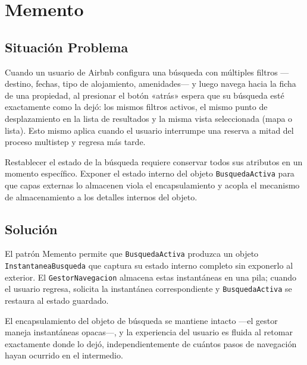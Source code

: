 
\chapter{Memento}

\section{Situación Problema}

Cuando un usuario de Airbnb configura una búsqueda con múltiples filtros
—destino, fechas, tipo de alojamiento, amenidades— y luego navega hacia
la ficha de una propiedad, al presionar el botón «atrás» espera que su
búsqueda esté exactamente como la dejó: los mismos filtros activos, el
mismo punto de desplazamiento en la lista de resultados y la misma vista
seleccionada (mapa o lista). Esto mismo aplica cuando el usuario
interrumpe una reserva a mitad del proceso multistep y regresa más tarde.

Restablecer el estado de la búsqueda requiere conservar todos sus
atributos en un momento específico. Exponer el estado interno del objeto
\texttt{BusquedaActiva} para que capas externas lo almacenen viola el
encapsulamiento y acopla el mecanismo de almacenamiento a los detalles
internos del objeto.

\section{Solución}

El patrón Memento permite que \texttt{BusquedaActiva} produzca un objeto
\texttt{InstantaneaBusqueda} que captura su estado interno completo sin
exponerlo al exterior. El \texttt{GestorNavegacion} almacena estas
instantáneas en una pila; cuando el usuario regresa, solicita la
instantánea correspondiente y \texttt{BusquedaActiva} se restaura al
estado guardado.

El encapsulamiento del objeto de búsqueda se mantiene intacto —el
gestor maneja instantáneas opacas—, y la experiencia del usuario es
fluida al retomar exactamente donde lo dejó, independientemente de cuántos
pasos de navegación hayan ocurrido en el intermedio.


